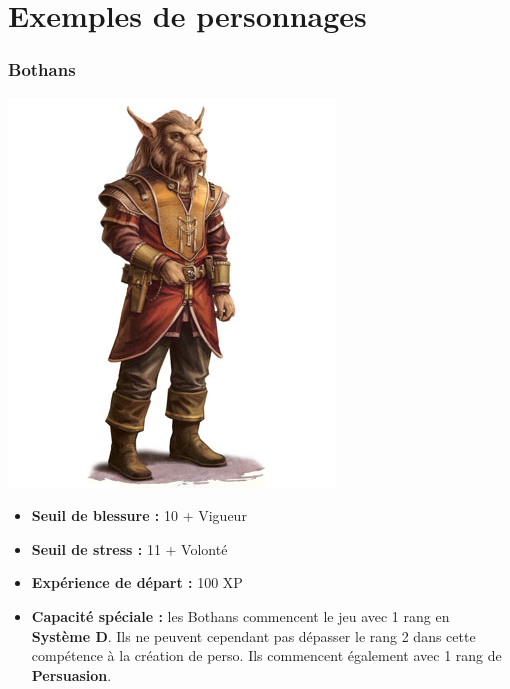 \documentclass{article}
\begin{document}
\part*{Exemples de personnages}

\section*{Bothans}
\noindent\begin{minipage}{0.3\textwidth}
	\includegraphics[width=1\linewidth]{../img/species/bothan}
\end{minipage}
\hfill
\begin{minipage}{0.7\textwidth}\raggedleft
	\begin{itemize}
		\item \textbf{Seuil de blessure :} 10 + Vigueur 
		\item \textbf{Seuil de stress :} 11 + Volonté 
		\item \textbf{Expérience de départ :} 100 XP
		\item \textbf{Capacité spéciale :} les Bothans commencent le jeu avec 1 rang en \textbf{Système D}. Ils ne peuvent cependant pas dépasser le rang 2 dans cette compétence à la création de perso. Ils commencent également avec 1 rang de \textbf{Persuasion}.
	\end{itemize}
\end{minipage}
\end{document}
